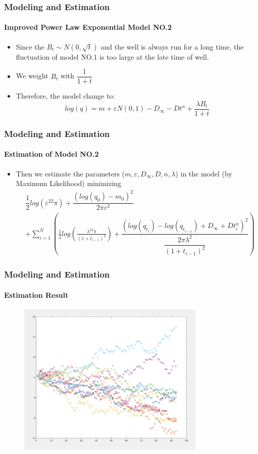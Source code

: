 \documentclass[11pt]{beamer}
\begin{document}
	\begin{frame}
		\frametitle{Modeling and Estimation}
		\framesubtitle{Improved Power Law Exponential Model NO.2}
		\justifying
		\begin{itemize}
		\item Since the $B_t\sim N(0,\sqrt{t})$ and the well is always run for a long time, the fluctuation of model NO.1 is too large at the late time of well.
		\item We weight $B_t$ with $\dfrac{1}{1+t}$
		\item Therefore, the model change to:
		\begin{equation}
		log(q)=m+\varepsilon N(0,1)-D_\infty - Dt^n+\dfrac{\lambda B_t}{1+t}
		\end{equation}
		\end{itemize}		
	\end{frame}		
	
	\begin{frame}
		\frametitle{Modeling and Estimation}
		\framesubtitle{Estimation of Model NO.2}
		\justifying
		\begin{itemize}
		\item Then we estimate the parameters ($m,\varepsilon,D_\infty,D,n,\lambda$) in the model (by Maximum Likelihood)  minimizing
		\begin{eqnarray*}
		&\dfrac{1}{2}log(\varepsilon^22\pi)+\dfrac{(log(q_0)-m_0)^2}{2 \pi \varepsilon^2} \\
		&+\sum_{i=1}^N\left(\frac{1}{2}log\left(\frac{\lambda^22\pi}{(1+t_{i-1})^2}\right)+\dfrac{(log(q_{t_i})-log(q_{t_{i-1}})+D_\infty+Dt_i^n)^2}{\dfrac{2\pi\lambda^2}{(1+t_{i-1})^2}}\right)
		\end{eqnarray*}
		\end{itemize}		
	\end{frame}		
	
				
	\begin{frame}
		\frametitle{Modeling and Estimation}
		\framesubtitle{Estimation Result}
		\justifying
\begin{figure}
\begin{center}
\includegraphics[width=0.8\textwidth  ]{like.PNG} 

\end{center}
\end{figure}
	\end{frame}		
	
\end{document}

